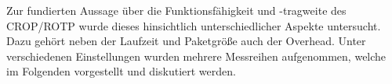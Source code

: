 \label{cap:protokollAnalyse}
Zur fundierten Aussage über die Funktionsfähigkeit und -tragweite des
\gls{CROP}/\gls{ROTP} wurde dieses hinsichtlich unterschiedlicher Aspekte
untersucht.
Dazu gehört neben der Laufzeit und Paketgröße auch der Overhead. Unter verschiedenen Einstellungen
wurden mehrere Messreihen aufgenommen, welche im Folgenden vorgestellt und
diskutiert werden.
